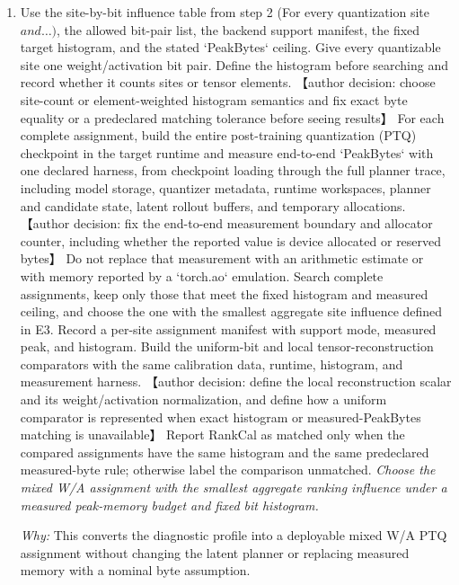 \documentclass[10pt,a4paper]{article}
\begin{document}
\begin{enumerate}[leftmargin=*,start=2]
  \item Use the site-by-bit influence table from step 2 (For every quantization site \(and\dots )\), the allowed bit-pair list, the backend support manifest, the fixed target histogram, and the stated `PeakBytes` ceiling. Give every quantizable site one weight/activation bit pair. Define the histogram before searching and record whether it counts sites or tensor elements. 【author decision: choose site-count or element-weighted histogram semantics and fix exact byte equality or a predeclared matching tolerance before seeing results】 For each complete assignment, build the entire post-training quantization (PTQ) checkpoint in the target runtime and measure end-to-end `PeakBytes` with one declared harness, from checkpoint loading through the full planner trace, including model storage, quantizer metadata, runtime workspaces, planner and candidate state, latent rollout buffers, and temporary allocations. 【author decision: fix the end-to-end measurement boundary and allocator counter, including whether the reported value is device allocated or reserved bytes】 Do not replace that measurement with an arithmetic estimate or with memory reported by a `torch.ao` emulation. Search complete assignments, keep only those that meet the fixed histogram and measured ceiling, and choose the one with the smallest aggregate site influence defined in E3. Record a per-site assignment manifest with support mode, measured peak, and histogram. Build the uniform-bit and local tensor-reconstruction comparators with the same calibration data, runtime, histogram, and measurement harness. 【author decision: define the local reconstruction scalar and its weight/activation normalization, and define how a uniform comparator is represented when exact histogram or measured-PeakBytes matching is unavailable】 Report RankCal as matched only when the compared assignments have the same histogram and the same predeclared measured-byte rule;\allowbreak{} otherwise label the comparison unmatched.
\noindent\emph{Choose the mixed W/A assignment with the smallest aggregate ranking influence under a measured peak-memory budget and fixed bit histogram.}
\par{}
\par\emph{Why:} This converts the diagnostic profile into a deployable mixed W/A PTQ assignment without changing the latent planner or replacing measured memory with a nominal byte assumption.
\end{enumerate}
\end{document}
